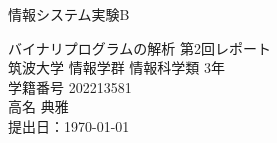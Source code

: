 \begin{titlepage}

\begin{flushright}
{\large
情報システム実験B
}
\end{flushright}
\begin{center}
\vspace*{200truept}
{\Huge バイナリプログラムの解析 第2回レポート}\\
\vspace{300truept}
{\LARGE 筑波大学 情報学群 情報科学類 3年}\\
\vspace{10truept}
{\LARGE 学籍番号 202213581}\\
\vspace{40truept}
{\huge 高名 典雅}\\
\vspace{40truept}
{\huge 提出日：\today}\\
\end{center}

\end{titlepage}
